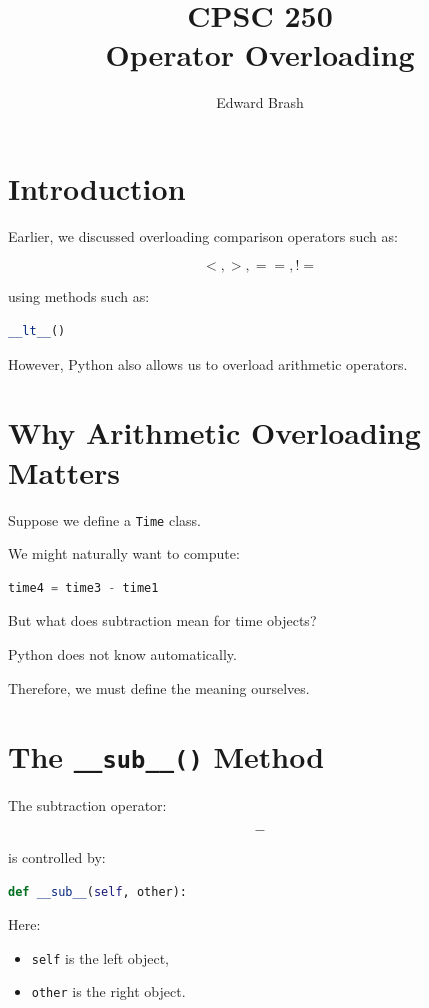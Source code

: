 \documentclass[11pt]{article}
\title{CPSC 250 \\ Operator Overloading}
\author{Edward Brash}
\date{}
\begin{document}
\maketitle

\section{Introduction}

Earlier, we discussed overloading comparison operators such as:

\[
<, >, ==, !=
\]

using methods such as:

\begin{lstlisting}[language=Python]
__lt__()
\end{lstlisting}

However, Python also allows us to overload arithmetic operators.

\section{Why Arithmetic Overloading Matters}

Suppose we define a \verb|Time| class.

We might naturally want to compute:

\begin{lstlisting}[language=Python]
time4 = time3 - time1
\end{lstlisting}

But what does subtraction mean for time objects?

Python does not know automatically.

Therefore, we must define the meaning ourselves.

\section{The \texttt{\_\_sub\_\_()} Method}

The subtraction operator:

\[
-
\]

is controlled by:

\begin{lstlisting}[language=Python]
def __sub__(self, other):
\end{lstlisting}

Here:

\begin{itemize}
    \item \verb|self| is the left object,
    \item \verb|other| is the right object.
\end{itemize}
\end{document}
